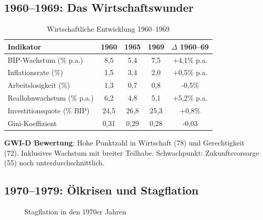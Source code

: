 \subsection{1960--1969: Das Wirtschaftswunder}

\begin{table}[ht]
\centering
\begin{tabular}{lcccc}
\toprule
\textbf{Indikator} & \textbf{1960} & \textbf{1965} & \textbf{1969} & \textbf{$\Delta$ 1960--69} \\
\midrule
BIP-Wachstum (\% p.a.) & 8,5 & 5,4 & 7,5 & +4,1\% p.a. \\
Inflationsrate (\%) & 1,5 & 3,4 & 2,0 & +0,5\% p.a. \\
Arbeitslosigkeit (\%) & 1,3 & 0,7 & 0,8 & -0,5\% \\
Reallohnwachstum (\% p.a.) & 6,2 & 4,8 & 5,1 & +5,2\% p.a. \\
Investitionsquote (\% BIP) & 24,5 & 26,8 & 25,3 & +0,8\% \\
Gini-Koeffizient & 0,31 & 0,29 & 0,28 & -0,03 \\
\bottomrule
\end{tabular}
\caption{Wirtschaftliche Entwicklung 1960--1969}
\label{tab:1960-1969}
\end{table}

\textbf{GWI-D Bewertung}: Hohe Punktzahl in Wirtschaft (78) und Gerechtigkeit (72). Inklusives Wachstum mit breiter Teilhabe. Schwachpunkt: Zukunftsvorsorge (55) noch unterdurchschnittlich.

\subsection{1970--1979: Ölkrisen und Stagflation}

\begin{figure}[h]
\centering
{}
\caption{Stagflation in den 1970er Jahren}
\label{fig:stagflation-1970er}
\end{figure}

